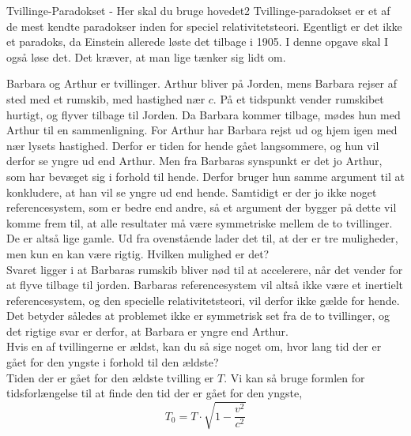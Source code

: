 \documentclass[crop=false, class=memoir]{standalone}
\begin{document}
\begin{opgave}{Tvillinge-Paradokset - Her skal du bruge hovedet}{2}
	Tvillinge-paradokset er et af de mest kendte paradokser inden for speciel relativitetsteori. Egentligt er det ikke
	et paradoks, da Einstein allerede løste det tilbage i 1905. I denne opgave skal I også løse det. Det kræver, at man
	lige tænker sig lidt om.
	
	Barbara og Arthur er tvillinger. Arthur bliver på Jorden, mens Barbara rejser af sted med et rumskib, med
	hastighed nær $c$. På et tidspunkt vender rumskibet hurtigt, og flyver tilbage til Jorden. Da Barbara kommer
	tilbage, mødes hun med Arthur til en sammenligning. For Arthur har Barbara rejst ud og hjem igen med nær
	lysets hastighed. Derfor er tiden for hende gået langsommere, og hun vil derfor se yngre ud end Arthur. Men
	fra Barbaras synspunkt er det jo Arthur, som har bevæget sig i forhold til hende. Derfor bruger hun samme
	argument til at konkludere, at han vil se yngre ud end hende. Samtidigt er der jo ikke noget referencesystem,
	som er bedre end andre, så et argument der bygger på dette vil komme frem til, at alle resultater må være
	symmetriske mellem de to tvillinger. De er altså lige gamle.
	\opg Ud fra ovenstående lader det til, at der er tre muligheder, men kun en kan være rigtig. Hvilken mulighed
	er det?\\
	
	Svaret ligger i at Barbaras rumskib bliver nød til at accelerere, når det vender for at flyve tilbage til jorden. Barbaras referencesystem vil altså ikke være et inertielt referencesystem, og den specielle relativitetsteori, vil derfor ikke gælde for hende. Det betyder således at problemet ikke er symmetrisk set fra de to tvillinger, og det rigtige svar er derfor, at Barbara er yngre end Arthur.\\
	\opg Hvis en af tvillingerne er ældst, kan du så sige noget om, hvor lang tid der er gået for den yngste i
	forhold til den ældste?\\
	
	Tiden der er gået for den ældste tvilling er $T$. Vi kan så bruge formlen for tidsforlængelse til at finde den tid der er gået for den yngste,
	$$T_0=T \cdot \sqrt{1-\frac{v^2}{c^2}}$$
\end{opgave}
\end{document}
